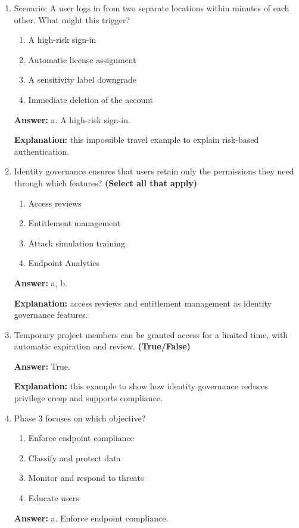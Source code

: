 \documentclass[10pt]{article}
\begin{document}
\begin{enumerate}[leftmargin=*]
\textbf{Explanation:} These are the exact anomalies named in the documentation.

\item Scenario: A user logs in from two separate locations within minutes of each other. What might this trigger?
\begin{enumerate}[label=\alph*., leftmargin=1.5em]
\item A high-risk sign-in
\item Automatic license assignment
\item A sensitivity label downgrade
\item Immediate deletion of the account
\end{enumerate}
\textbf{Answer:} a. A high-risk sign-in.

\textbf{Explanation:} this impossible travel example to explain risk-based authentication.

\item Identity governance ensures that users retain only the permissions they need through which features? \textbf{(Select all that apply)}
\begin{enumerate}[label=\alph*., leftmargin=1.5em]
\item Access reviews
\item Entitlement management
\item Attack simulation training
\item Endpoint Analytics
\end{enumerate}
\textbf{Answer:} a, b.

\textbf{Explanation:} access reviews and entitlement management as identity governance features.

\item Temporary project members can be granted access for a limited time, with automatic expiration and review. \textbf{(True/False)}

\textbf{Answer:} True.

\textbf{Explanation:} this example to show how identity governance reduces privilege creep and supports compliance.

\item Phase 3 focuses on which objective?
\begin{enumerate}[label=\alph*., leftmargin=1.5em]
\item Enforce endpoint compliance
\item Classify and protect data
\item Monitor and respond to threats
\item Educate users
\end{enumerate}
\textbf{Answer:} a. Enforce endpoint compliance.


\end{enumerate}
\end{document}
